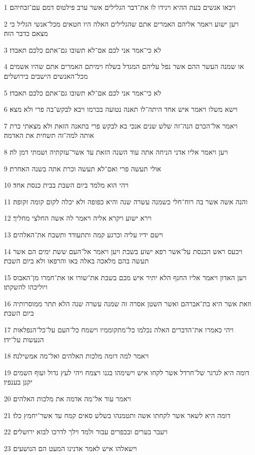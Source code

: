 \par 1 ויבאו אנשים בעת ההיא ויגידו לו את־דבר הגלילים אשר ערב פילטוס דמם עם־זבחיהם׃
\par 2 ויען ישוע ויאמר אליהם האמרים אתם שהגלילים האלה היו חטאים מכל־אנשי הגליל כי מצאם כדבר הזה׃
\par 3 לא כי־אמר אני לכם אם־לא תשובו גם־אתם כלכם תאבדו׃
\par 4 או שמנה העשר ההם אשר נפל עליהם המגדל בשלח וימיתם האמרים אתם שהיו אשמים מכל־האנשים הישבים בירושלים׃
\par 5 לא כי־אמר אני לכם אם־לא תשובו גם־אתם כלכם תאבדו׃
\par 6 וישא משלו ויאמר איש אחד היתה־לו תאנה נטועה בכרמו ויבא לבקש־בה פרי ולא מצא׃
\par 7 ויאמר אל־הכרם הנה־זה שלש שנים אנכי בא לבקש פרי בתאנה הזאת ולא מצאתי כרת אותה למה־זה תשחית את האדמה׃
\par 8 ויען ויאמר אליו אדני הניחה אתה עוד השנה הזאת עד אשר־עזקתיה ושמתי דמן לה׃
\par 9 אולי תעשה פרי ואם־לא תעשה וכרת אתה בשנה האחרת׃
\par 10 ויהי הוא מלמד ביום השבת בבית כנסת אחד׃
\par 11 והנה אשה אשר בה רוח־חלי כשמנה עשרה שנה והיא כפופה ולא יכלה לקום קומה זקופה׃
\par 12 וירא ישוע ויקרא אליה ויאמר לה אשה החלצי מחליך׃
\par 13 וישם ידיו עליה וכרגע קמה ותתעודד ותשבח את־האלהים׃
\par 14 ויכעס ראש הכנסת על־אשר רפא ישוע בשבת ויען ויאמר אל־העם ששת ימים הם אשר תעשה בהם מלאכה באלה באו והרפאו ולא ביום השבת׃
\par 15 ויען האדון ויאמר אליו החנף הלא יתיר איש מכם בשבת את־שורו או את־חמרו מן־האבוס ויוליכהו להשקתו׃
\par 16 וזאת אשר היא בת־אברהם ואשר השטן אסרה זה שמנה עשרה שנה הלא תתר ממוסרותיה ביום השבת׃
\par 17 ויהי כאמרו את־הדברים האלה נכלמו כל־מתקוממיו וישמח כל־העם על־כל־הנפלאות הנעשות על־ידו׃
\par 18 ויאמר למה דומה מלכות האלהים ואל־מה אמשילנה׃
\par 19 דומה היא לגרגר של־חרדל אשר לקחו איש וישימהו בגנו ויצמח ויהי לעץ גדול ועוף השמים יקנן בענפיו׃
\par 20 ויאמר עוד אל־מה אדמה את מלכות האלהים׃
\par 21 דומה היא לשאר אשר לקחתו אשה ותטמנהו בשלש סאים קמח עד אשר־יחמץ כלו׃
\par 22 ויעבר בערים ובכפרים עבור ולמד וילך לדרכו לבוא ירושלים׃
\par 23 וישאלהו איש לאמר אדנינו המעט הם הנושעים׃
